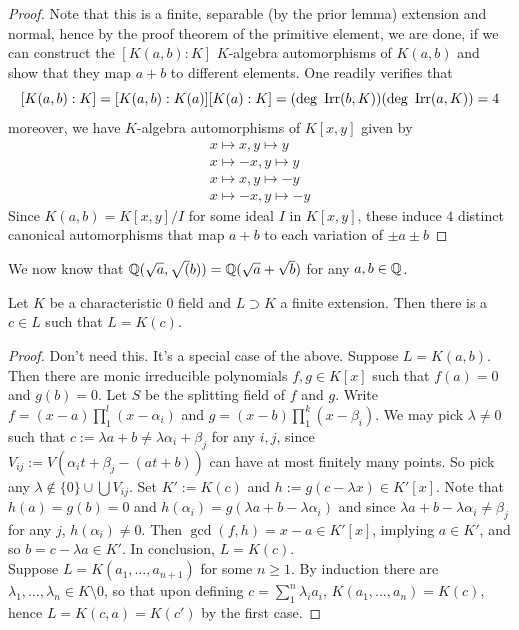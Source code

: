     \begin{proof}
        Note that this is a finite, separable (by the prior lemma) extension and normal, hence by the proof theorem of the primitive element, we are done, if we can construct the $[K(a,b) : K]$ $K$-algebra automorphisms of $K(a,b)$ and show that they map $a+b$ to different elements. One readily verifies that 
        $$
            [K(a,b) : K] = [K(a,b) : K(a)][K(a) : K] =  (\deg\ \mathrm{Irr}(b,K))(\deg \ \mathrm{Irr}(a,K)) = 4
        $$ 
        moreover, we have $K$-algebra automorphisms of $K[x,y]$ given by 
        \begin{gather*}
            x \mapsto x, y\mapsto y\\
            x \mapsto -x, y\mapsto y\\
            x \mapsto x, y\mapsto -y\\
            x\mapsto -x, y\mapsto -y
        \end{gather*}  
        Since $K(a,b) = K[x,y]/I$ for some ideal $I$ in $K[x,y]$, these induce $4$ distinct canonical automorphisms that map $a+b$ to each variation of $\pm a \pm b$ 
    \end{proof}
    \begin{example}
        We now know that $\mathbb{Q}(\sqrt{a},\sqrt(b)) = \mathbb{Q}(\sqrt{a}+\sqrt{b})$ for any $a,b\in \mathbb{Q}$. 
    \end{example}
    \begin{theorem}
        Let $K$ be a characteristic $0$ field and $L\supset K$ a finite extension. Then there is a $c\in L$ such that $L=K(c)$.
    \end{theorem}
    \begin{proof}
        {\Large Don't need this. It's a special case of the above.}
        Suppose $L=K(a,b)$. Then there are monic irreducible polynomials $f,g\in K[x]$ such that $f(a)=0$ and $g(b)=0$. Let $S$ be the splitting field of $f$ and $g$. Write $f=(x-a)\prod_1^l (x-\alpha_i)$ and $g=(x-b)\prod_1^k(x-\beta_i)$. We may pick $\lambda \neq 0$ such that $c:=\lambda a+b\neq \lambda \alpha_i+ \beta_j$ for any $i,j$, since $V_{ij}:=V(\alpha_it+\beta_j-(at+b))$ can have at most finitely many points. So pick any $\lambda\notin \{0\}\cup\bigcup V_{ij}$. Set $K':= K(c)$ and $h:=g(c-\lambda x)\in K'[x]$. Note that $h(a)=g(b)=0$ and $h(\alpha_i)=g(\lambda a + b-\lambda\alpha_i)$ and since $\lambda a + b-\lambda\alpha_i\neq \beta_j$ for any $j$, $h(\alpha_i)\neq 0$. Then $\gcd(f,h)=x-a\in K'[x]$, implying $a\in K'$, and so $b=c-\lambda a\in K'$. In conclusion, $L=K(c)$.\\
        Suppose $L=K(a_1,\dots,a_{n+1})$ for some $n\geq 1$. By induction there are $\lambda_1,\dots,\lambda_n\in K\setminus 0$, so that upon defining $c=\sum_1^n \lambda_ia_i$,  $K(a_1,\dots,a_n)=K(c)$, hence $L=K(c,a)=K(c')$ by the first case.
    \end{proof}
